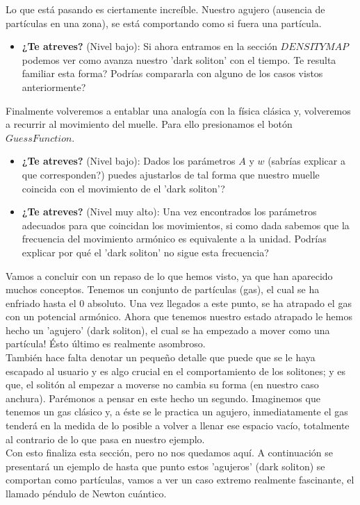 Lo que est\'a pasando es ciertamente incre\'ible. Nuestro agujero (ausencia de part\'iculas en una zona), se est\'a comportando como si fuera una part\'icula. 

\begin{itemize}
	\item \textbf{¿Te atreves?} (Nivel bajo): Si ahora entramos en la secci\'on $DENSITY MAP$ podemos ver como avanza nuestro 'dark soliton' con el tiempo. Te resulta familiar esta forma? Podr\'ias compararla con alguno de los casos vistos anteriormente?
\end{itemize}

Finalmente volveremos a entablar una analog\'ia con la f\'isica cl\'asica y, volveremos a recurrir al movimiento del muelle. Para ello presionamos el bot\'on $Guess Function$.

\begin{itemize}
	\item \textbf{¿Te atreves?} (Nivel bajo): Dados los par\'ametros $A$ y $w$ (sabr\'ias explicar a que corresponden?) puedes ajustarlos de tal forma que nuestro muelle coincida con el movimiento de el 'dark soliton'?
\end{itemize}

\begin{itemize}
	\item \textbf{¿Te atreves?} (Nivel muy alto): Una vez encontrados los par\'ametros adecuados para que coincidan los movimientos, si como dada sabemos que la frecuencia del movimiento arm\'onico es equivalente a la unidad. Podr\'ias explicar por qu\'e el 'dark soliton' no sigue esta frecuencia?
\end{itemize}

Vamos a concluir con un repaso de lo que hemos visto, ya que han aparecido muchos conceptos. Tenemos un conjunto de part\'iculas (gas), el cual se ha enfriado hasta el 0 absoluto. Una vez llegados a este punto, se ha atrapado el gas con un potencial arm\'onico. Ahora que tenemos nuestro estado atrapado le hemos hecho un 'agujero' (dark soliton), el cual se ha empezado a mover como una part\'icula! \'Esto \'ultimo es realmente asombroso. 
\\

Tambi\'en hace falta denotar un peque\~{n}o detalle que puede que se le haya escapado al usuario y es algo crucial en el comportamiento de los solitones; y es que, el solit\'on al empezar a moverse no cambia su forma (en nuestro caso anchura). Par\'emonos a pensar en este hecho un segundo. Imaginemos que tenemos un gas cl\'asico y, a \'este se le practica un agujero, inmediatamente el gas tender\'a en la medida de lo posible a volver a llenar ese espacio vac\'io, totalmente al contrario de lo que pasa en nuestro ejemplo.
\\

Con esto finaliza esta secci\'on, pero no nos quedamos aqu\'i. A continuaci\'on se presentar\'a un ejemplo de hasta que punto estos 'agujeros' (dark soliton) se comportan como part\'iculas, vamos a ver un caso extremo realmente fascinante, el llamado p\'endulo de Newton cu\'antico.